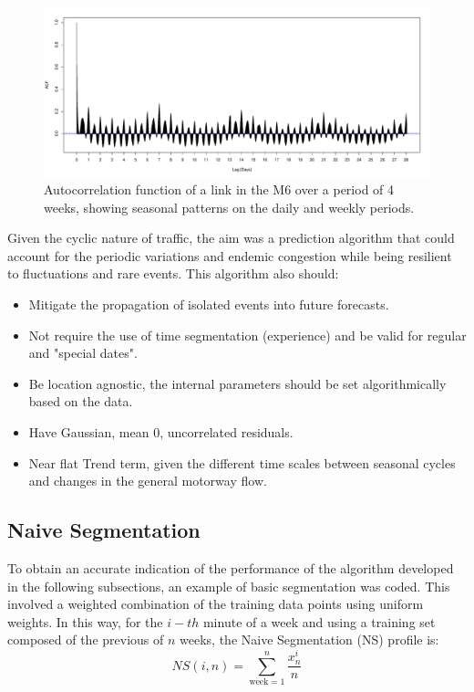 \documentclass[conference, letterpaper]{IEEEtran}
\begin{document}
\begin{figure}[htbp]
	\centerline{\includegraphics[width=\linewidth]{./images/finalplots/ACF_M6_Link3.pdf}}
	\caption{Autocorrelation function of a link in the M6 over a period of 4 weeks, showing seasonal patterns on the daily and weekly periods.}
	\label{fig:travel_time_example}
\end{figure}

Given the cyclic nature of traffic, the aim was a prediction algorithm that could account for the periodic variations and endemic congestion while being resilient to fluctuations and rare events. This algorithm also should:
\begin{itemize}
	\item Mitigate the propagation of isolated events into future forecasts.
	\item Not require the use of time segmentation (experience) and be valid for regular and "special dates".
	\item Be location agnostic, the internal parameters should be set algorithmically based on the data.
	\item Have Gaussian, mean 0, uncorrelated residuals.
	\item Near flat Trend term, given the different time scales between seasonal cycles and changes in the general motorway flow.
\end{itemize}

\subsection{Naive Segmentation}
To obtain an accurate indication of the performance of the algorithm developed in the following subsections, an example of basic segmentation was coded. 
This involved a weighted combination of the training data points using uniform weights. 
In this way, for the $i-th$ minute of a week and using a training set composed of the previous of $n$ weeks, the Naive Segmentation (NS) profile is:
\begin{equation}
NS(i,n) = \sum_{\textrm{week}=1}^{n} \frac{x^i_n}{n} 
\end{equation}
\end{document}
